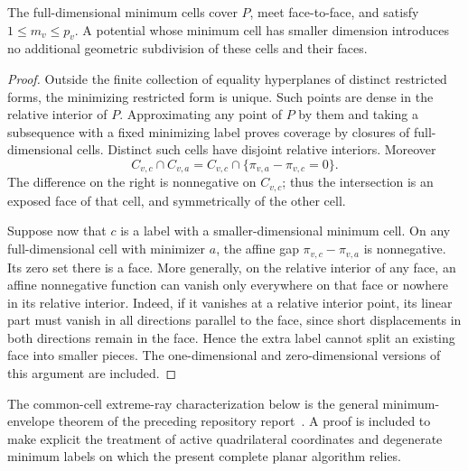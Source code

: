 \begin{lemma}
\label{pl:degenerate-labels}
The full-dimensional minimum cells cover \(P\), meet face-to-face,
and satisfy \(1\leq m_v\leq p_v\).  A potential whose minimum cell
has smaller dimension introduces no additional geometric subdivision
of these cells and their faces.
\end{lemma}
\begin{proof}
Outside the finite collection of equality hyperplanes of distinct
restricted forms, the minimizing restricted form is unique.
Such points are dense in the relative interior of \(P\).
Approximating any point of \(P\) by them and taking a subsequence
with a fixed minimizing label proves coverage by closures of
full-dimensional cells.  Distinct such cells have disjoint relative
interiors.  Moreover
\[
 C_{v,c}\cap C_{v,a}
 =C_{v,c}\cap\{\pi_{v,a}-\pi_{v,c}=0\}.
\]
The difference on the right is nonnegative on \(C_{v,c}\);
thus the intersection is an exposed face of that cell, and
symmetrically of the other cell.

Suppose now that \(c\) is a label with a smaller-dimensional minimum
cell.  On any full-dimensional cell with minimizer \(a\), the affine
gap \(\pi_{v,c}-\pi_{v,a}\) is nonnegative.  Its zero set there is a
face.  More generally, on the relative interior of any face, an affine
nonnegative function can vanish only everywhere on that face or
nowhere in its relative interior.  Indeed, if it vanishes at a
relative interior point, its linear part must vanish in all directions
parallel to the face, since short displacements in both directions
remain in the face.  Hence the extra label cannot split an existing
face into smaller pieces.  The one-dimensional and zero-dimensional
versions of this argument are included.
\end{proof}

The common-cell extreme-ray characterization below is the general
minimum-envelope theorem of the preceding repository
report~\cite{MinimumEnvelopes}.  A proof is included to make explicit
the treatment of active quadrilateral coordinates and degenerate
minimum labels on which the present complete planar algorithm relies.

